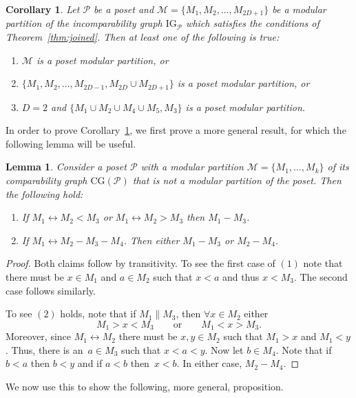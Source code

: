 \documentclass[9pt,a4paper,oneside]{article}
\newtheorem{lemma}[theorem]{Lemma}
\newtheorem{corollary}[theorem]{Corollary}
\newcommand{\cM}{\mathcal{M}}
\newcommand{\cP}{\mathcal{P}}
\newcommand{\CG}{\mathrm{CG}}
\newcommand{\IG}{\mathrm{IG}}
\begin{document}
\begin{corollary}\label{cor:the_ones}
Let $\cP$ be a poset and $\cM=\{M_1,M_2,\ldots,M_{2D+1}\}$ be a modular partition of the incomparability graph $\IG_\cP$ which satisfies the conditions of Theorem~\ref{thm:joined}. Then at least one of the following is true:
\begin{enumerate}
\item $\cM$ is a poset modular partition, or
\item $\{M_1,M_2,\ldots,M_{2D-1},M_{2D}\cup M_{2D+1}\}$ is a poset modular partition, or
\item $D=2$ and $\{M_1\cup M_2\cup M_4\cup M_5,M_3\}$ is a poset modular partition.
\end{enumerate}
\end{corollary}

In order to prove Corollary~\ref{cor:the_ones}, we first prove a more general result, for which the following lemma will be useful. 

\begin{lemma}\label{lemma:module_paths}
Consider a poset $\cP$ with a modular partition $\cM=\{M_1,\ldots,M_k\}$  of its comparability graph $\CG(\cP)$ that is not a modular partition of the poset.  Then the following hold: 
\begin{enumerate}
\item If $M_1 \leftrightarrow M_2 < M_3$ or $M_1 \leftrightarrow M_2 > M_3$ then $M_1-M_3$. 
\item If $M_1 \leftrightarrow M_2 - M_3-M_4$. Then either $M_1 - M_3$ or $M_2 - M_4$.
\end{enumerate}
\end{lemma}
\begin{proof}
Both claims follow by transitivity.  
To see the first case of $(1)$ note that there must be $x\in M_1$ and $a\in M_2$ such that $x<a$ and thus $x<M_3$.
The second case follows similarly.


To see $(2)$ holds, note that if $M_1 \parallel M_3$, then $\forall x\in M_2$ either 
\[M_1>x<M_3 \quad\quad\text{or}\quad\quad M_1<x>M_3.\]
Moreover, since $M_1\leftrightarrow M_2$ there must be $x,y\in M_2$ such that $M_1>x$ and $M_1<y$.  Thus, there is an~$a\in M_3$ such that $x<a<y$. 
Now let $b\in M_4$. Note that if $b<a$ then $b<y$ 
and if $a<b$ then~$x<b$. In either case, $M_2 - M_4$.
\end{proof}

We now use this to show the following, more general, proposition.
\end{document}
